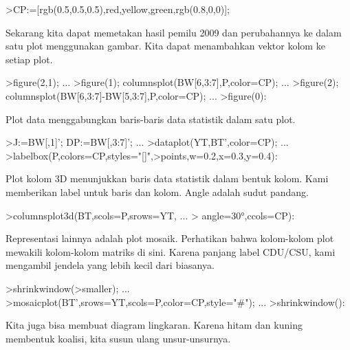 \documentclass[a4paper,10pt]{article}
\begin{document}
\begin{eulernotebook}
\begin{eulercomment}
\end{eulercomment}
\begin{eulerprompt}
>CP:=[rgb(0.5,0.5,0.5),red,yellow,green,rgb(0.8,0,0)];
\end{eulerprompt}
\begin{eulercomment}
Sekarang kita dapat memetakan hasil pemilu 2009 dan perubahannya ke
dalam satu plot menggunakan gambar. Kita dapat menambahkan vektor
kolom ke setiap plot.
\end{eulercomment}
\begin{eulerprompt}
>figure(2,1);  ...
>figure(1); columnsplot(BW[6,3:7],P,color=CP); ...
>figure(2); columnsplot(BW[6,3:7]-BW[5,3:7],P,color=CP);  ...
>figure(0):
\end{eulerprompt}
\begin{eulercomment}
Plot data menggabungkan baris-baris data statistik dalam satu plot.
\end{eulercomment}
\begin{eulerprompt}
>J:=BW[,1]'; DP:=BW[,3:7]'; ...
>dataplot(YT,BT',color=CP);  ...
>labelbox(P,colors=CP,styles="[]",>points,w=0.2,x=0.3,y=0.4):
\end{eulerprompt}
\begin{eulercomment}
Plot kolom 3D menunjukkan baris data statistik dalam bentuk kolom.
Kami memberikan label untuk baris dan kolom. Angle adalah sudut
pandang.
\end{eulercomment}
\begin{eulerprompt}
>columnsplot3d(BT,scols=P,srows=YT, ...
>  angle=30°,ccols=CP):
\end{eulerprompt}
\begin{eulercomment}
Representasi lainnya adalah plot mosaik. Perhatikan bahwa kolom-kolom
plot mewakili kolom-kolom matriks di sini. Karena panjang label
CDU/CSU, kami mengambil jendela yang lebih kecil dari biasanya.
\end{eulercomment}
\begin{eulerprompt}
>shrinkwindow(>smaller);  ...
>mosaicplot(BT',srows=YT,scols=P,color=CP,style="#"); ...
>shrinkwindow():
\end{eulerprompt}
\begin{eulercomment}
Kita juga bisa membuat diagram lingkaran. Karena hitam dan kuning
membentuk koalisi, kita susun ulang unsur-unsurnya.
\end{eulercomment}

\end{eulernotebook}
\end{document}

